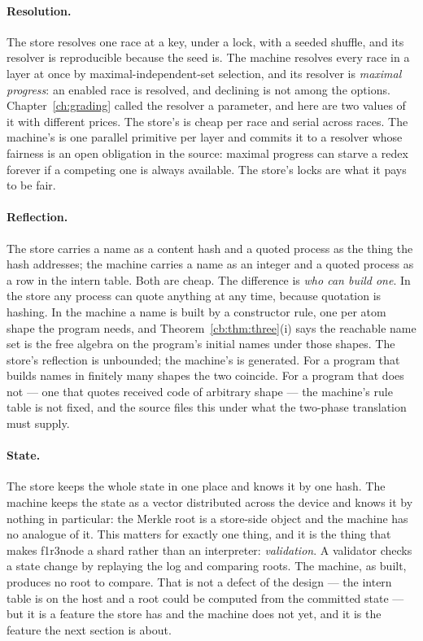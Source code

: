 \paragraph{Resolution.} The store resolves one race at a key, under a lock, with a
seeded shuffle, and its resolver is reproducible because the seed is. The machine resolves
every race in a layer at once by maximal-independent-set selection, and its resolver is
\emph{maximal progress}: an enabled race is resolved, and declining is not among the
options. Chapter~\ref{ch:grading} called the resolver a parameter, and here are two values
of it with different prices. The store's is cheap per race and serial across races. The
machine's is one parallel primitive per layer and commits it to a resolver whose fairness
is an open obligation in the source: maximal progress can starve a redex forever if a
competing one is always available. The store's locks are what it pays to be fair.

\paragraph{Reflection.} The store carries a name as a content hash and a quoted process as
the thing the hash addresses; the machine carries a name as an integer and a quoted process
as a row in the intern table. Both are cheap. The difference is \emph{who can build one}.
In the store any process can quote anything at any time, because quotation is hashing. In
the machine a name is built by a constructor rule, one per atom shape the program needs, and
Theorem~\ref{cb:thm:three}(i) says the reachable name set is the free algebra on the
program's initial names under those shapes. The store's reflection is unbounded; the
machine's is generated. For a program that builds names in finitely many shapes the two
coincide. For a program that does not --- one that quotes received code of arbitrary shape
--- the machine's rule table is not fixed, and the source files this under what the two-phase
translation must supply.

\paragraph{State.} The store keeps the whole state in one place and knows it by one hash.
The machine keeps the state as a vector distributed across the device and knows it by
nothing in particular: the Merkle root is a store-side object and the machine has no
analogue of it. This matters for exactly one thing, and it is the thing that makes f1r3node
a shard rather than an interpreter: \emph{validation}. A validator checks a state change by
replaying the log and comparing roots. The machine, as built, produces no root to compare.
That is not a defect of the design --- the intern table is on the host and a root could be
computed from the committed state --- but it is a feature the store has and the machine
does not yet, and it is the feature the next section is about.

